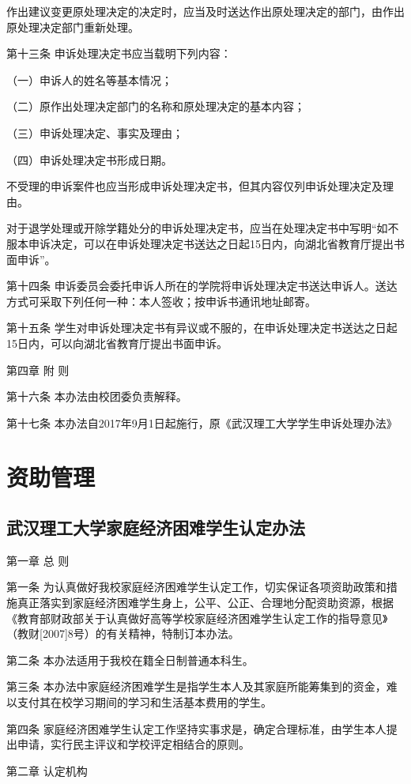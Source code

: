 \documentclass[UTF8,12pt,a4paper]{report}
\begin{document}
作出建议变更原处理决定的决定时，应当及时送达作出原处理决定的部门，由作出原处理决定部门重新处理。

第十三条  申诉处理决定书应当载明下列内容：

（一）申诉人的姓名等基本情况；

（二）原作出处理决定部门的名称和原处理决定的基本内容；

（三）申诉处理决定、事实及理由；

（四）申诉处理决定书形成日期。

不受理的申诉案件也应当形成申诉处理决定书，但其内容仅列申诉处理决定及理由。

对于退学处理或开除学籍处分的申诉处理决定书，应当在处理决定书中写明“如不服本申诉决定，可以在申诉处理决定书送达之日起15日内，向湖北省教育厅提出书面申诉”。

第十四条  申诉委员会委托申诉人所在的学院将申诉处理决定书送达申诉人。送达方式可采取下列任何一种：本人签收；按申诉书通讯地址邮寄。

第十五条  学生对申诉处理决定书有异议或不服的，在申诉处理决定书送达之日起15日内，可以向湖北省教育厅提出书面申诉。



第四章  附 则

第十六条  本办法由校团委负责解释。

第十七条  本办法自2017年9月1日起施行，原《武汉理工大学学生申诉处理办法》

\part{资助管理}
\chapter{武汉理工大学家庭经济困难学生认定办法}
第一章 总 则

第一条 为认真做好我校家庭经济困难学生认定工作，切实保证各项资助政策和措施真正落实到家庭经济困难学生身上，公平、公正、合理地分配资助资源，根据《教育部财政部关于认真做好高等学校家庭经济困难学生认定工作的指导意见》（教财[2007]8号）的有关精神，特制订本办法。

第二条 本办法适用于我校在籍全日制普通本科生。

第三条 本办法中家庭经济困难学生是指学生本人及其家庭所能筹集到的资金，难以支付其在校学习期间的学习和生活基本费用的学生。

第四条 家庭经济困难学生认定工作坚持实事求是，确定合理标准，由学生本人提出申请，实行民主评议和学校评定相结合的原则。

第二章 认定机构
\end{document}
